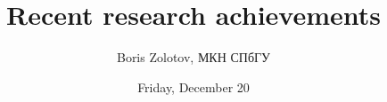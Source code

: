 \documentclass[aspectratio=1610,12pt,notheorems]{beamer}
\title{\LARGE Recent research achievements}
\author{Boris Zolotov, {\small МКН СПбГУ}}
\date{Friday, December 20}
\institute{Advanced Mathematics}
\begin{document}
\frame{\titlepage}









\begin{frame}
\scriptsize
	
	
\end{frame}
\end{document}
